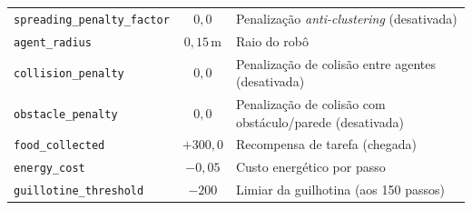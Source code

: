 \documentclass[12pt,reqno, twoside]{amsbook}
\theoremstyle{plain}
\numberwithin{equation}{chapter}
\numberwithin{section}{chapter}
\numberwithin{table}{chapter}
\numberwithin{figure}{chapter}
\begin{document}
\begin{table}[!htbp]
\begin{tabular}{|l|c|p{6.6cm}|}
\texttt{spreading\_penalty\_factor} & $0{,}0$ & Penalização \textit{anti-clustering} (desativada) \\
\texttt{agent\_radius} & $0{,}15$\,m & Raio do robô \\
\texttt{collision\_penalty} & $0{,}0$ & Penalização de colisão entre agentes (desativada) \\
\texttt{obstacle\_penalty} & $0{,}0$ & Penalização de colisão com obstáculo/parede (desativada) \\
\texttt{food\_collected} & $+300{,}0$ & Recompensa de tarefa (chegada) \\
\texttt{energy\_cost} & $-0{,}05$ & Custo energético por passo \\
\texttt{guillotine\_threshold} & $-200$ & Limiar da guilhotina (aos 150 passos) \\ \hline
\end{tabular}
\end{table}
\end{document}

